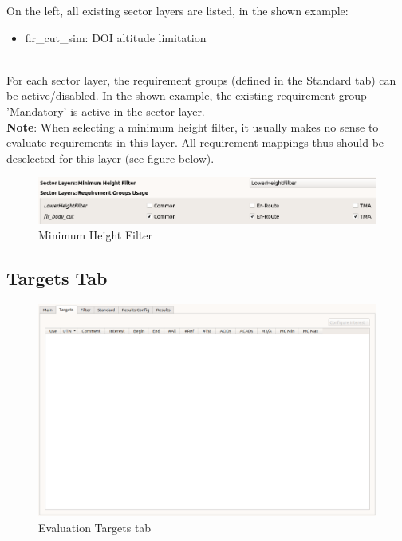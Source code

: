 On the left, all existing sector layers are listed, in the shown example:
\begin{itemize}  
\item fir\_cut\_sim: DOI altitude limitation
\end{itemize}
\ \\

For each sector layer, the requirement groups (defined in the Standard tab) can be active/disabled. In the shown example, the existing requirement group 'Mandatory' is active in the sector layer. \\

\textbf{Note}: When selecting a minimum height filter, it usually makes no sense to evaluate requirements in this layer.
All requirement mappings thus should be deselected for this layer (see figure below).

\begin{figure}[H]
  \hspace*{-2cm}
    \includegraphics[width=18cm,frame]{figures/eval_unmap_min_height_filter.png}
  \caption{Minimum Height Filter}
\end{figure}

\subsection{Targets Tab}

\begin{figure}[H]
  \hspace*{-2cm}
    \includegraphics[width=18cm,frame]{figures/eval_targets_empty.png}
  \caption{Evaluation Targets tab}
\end{figure}

